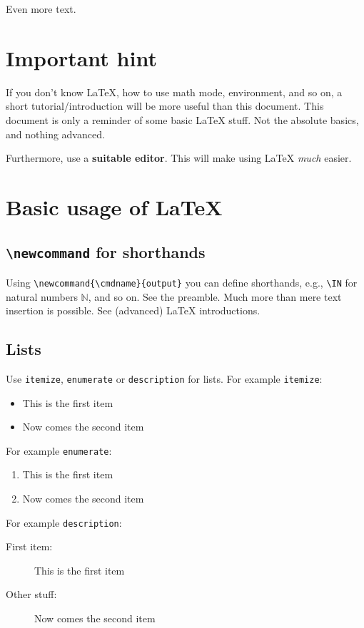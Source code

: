 \documentclass[11pt]{scrartcl}
\theoremstyle{plain} %
\theoremstyle{definition} %
\theoremstyle{remark} %
\newcommand{\IN}{\mathbb{N}} %
\begin{document}
Even more text.


\section{Important hint}

If you don't know \LaTeX{}, how to use math mode, environment, and so on,
a short tutorial/introduction will be more useful than this document.
This document is only a reminder of some basic \LaTeX{} stuff.
Not the absolute basics, and nothing advanced.

Furthermore, use a \textbf{suitable editor}.
This will make using \LaTeX{} \emph{much} easier.

\section{Basic usage of \LaTeX}
\label{sec:math-and-env}


\subsection{{\texttt{\textbackslash{}newcommand} for shorthands}}
\label{subsec:newcommand}

Using \verb|\newcommand{\cmdname}{output}| you can define shorthands,
e.g., \verb|\IN| for natural numbers $\IN$, and so on.
See the preamble.
Much more than mere text insertion is possible.
See (advanced) \LaTeX{} introductions.

\subsection{Lists}
\label{subsec:lists}

Use \verb|itemize|, \verb|enumerate| or \verb|description| for lists.
For example \verb|itemize|:
\begin{itemize}
  \item This is the first item
  \item Now comes the second item
\end{itemize}

For example \verb|enumerate|:
\begin{enumerate}
  \item This is the first item
  \item Now comes the second item
\end{enumerate}

For example \verb|description|:
\begin{description}
  \item[First item:] This is the first item
  \item[Other stuff:] Now comes the second item
\end{description}
\end{document}
